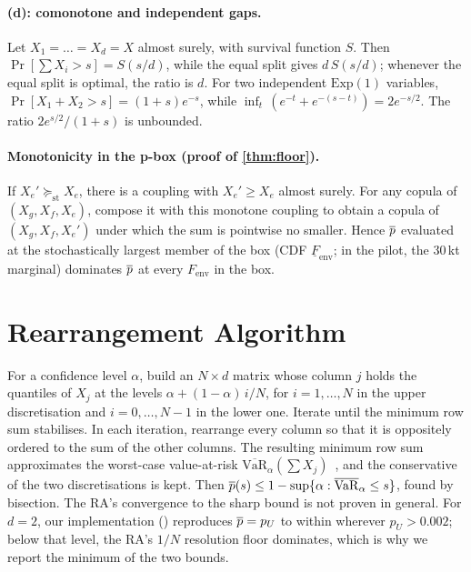 \paragraph{(d): comonotone and independent gaps.}
Let $X_1=\dots=X_d=X$ almost surely, with survival function $S$. Then
$\Pr[\sum X_i>s]=S(s/d)$, while the equal split gives $d\,S(s/d)$; whenever the
equal split is optimal, the ratio is $d$. For two independent $\mathrm{Exp}(1)$
variables, $\Pr[X_1+X_2>s]=(1+s)e^{-s}$, while
$\inf_t\,(e^{-t}+e^{-(s-t)})=2e^{-s/2}$. The ratio $2e^{s/2}/(1+s)$ is unbounded.

\paragraph{Monotonicity in the p-box (proof of \cref{thm:floor}).}
If $X_e'\succeq_{\mathrm{st}}X_e$, there is a coupling with $X_e'\ge X_e$ almost
surely. For any copula of $(X_g,X_f,X_e)$, compose it with this monotone
coupling to obtain a copula of $(X_g,X_f,X_e')$ under which the sum is
pointwise no smaller. Hence $\overline{p}$ evaluated at the stochastically largest
member of the box (CDF $\underline F_{\mathrm{env}}$; in the pilot, the 30\,kt
marginal) dominates $\overline{p}$ at every $F_{\mathrm{env}}$ in the box.

\section{Rearrangement Algorithm}
\label{app:ra}
For a confidence level $\alpha$, build an $N\times d$ matrix whose column $j$
holds the quantiles of $X_j$ at the levels $\alpha+(1-\alpha)\,i/N$, for $i=1,\dots,N$
in the upper discretisation and $i=0,\dots,N-1$ in the lower one. Iterate until
the minimum row sum stabilises. In each iteration, rearrange every column so
that it is oppositely ordered to the sum of the other columns. The resulting
minimum row sum approximates the worst-case value-at-risk
$\overline{\mathrm{VaR}}_\alpha(\sum X_j)$~\cite{embrechts2013var}, and the
conservative of the two discretisations is kept. Then
$\overline{p}(s)\le1-\sup\{\alpha:\overline{\mathrm{VaR}}_\alpha\le s\}$, found by
bisection. The RA's convergence to the sharp bound is not proven in general.
For $d=2$, our implementation () reproduces $\overline{p}=p_U$ to
within \nUnionRaDtwoMaxErr{} wherever $p_U>0.002$; below that level, the RA's
$1/N$ resolution floor dominates, which is why we report the minimum of the two
bounds.


